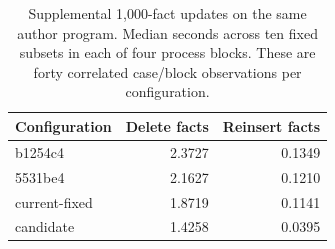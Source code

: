 \begin{table}[ht]
\caption{Supplemental 1,000-fact updates on the same author program. Median seconds across ten fixed subsets in each of four process blocks. These are forty correlated case/block observations per configuration.}
\label{tab:zodiac-facts}
\centering\small
\begin{tabular}{@{}lrr@{}}
\toprule
Configuration & Delete facts & Reinsert facts \\
\midrule
b1254c4 & 2.3727 & 0.1349 \\
5531be4 & 2.1627 & 0.1210 \\
current-fixed & 1.8719 & 0.1141 \\
candidate & 1.4258 & 0.0395 \\
\bottomrule
\end{tabular}
\end{table}
